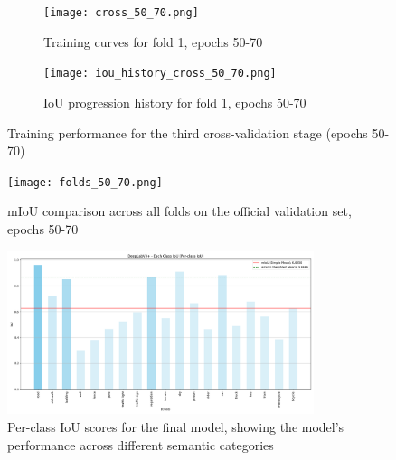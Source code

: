 \documentclass[]{article}
\begin{document}
\begin{figure}[htbp]
    \centering
    \begin{subfigure}[b]{0.8\textwidth}
        \centering
        \texttt{[image: cross\_50\_70.png]}
        \caption{Training curves for fold 1, epochs 50-70}
        \label{fig:cross_val_50_70}
    \end{subfigure}
    \vspace{0.5cm}
    \begin{subfigure}[b]{0.8\textwidth}
        \centering
        \texttt{[image: iou\_history\_cross\_50\_70.png]}
        \caption{IoU progression history for fold 1, epochs 50-70}
        \label{fig:cross_val_50_70_iou_his}
    \end{subfigure}
    \caption{Training performance for the third cross-validation stage (epochs 50-70)}
    \label{fig:cross_val_50_70_combined}
\end{figure}

\begin{figure}[htbp]
    \centering
    \texttt{[image: folds\_50\_70.png]}
    \caption{mIoU comparison across all folds on the official validation set, epochs 50-70}
    \label{fig:cross_val_50_70_val}
\end{figure}

\begin{figure}[htbp]
    \centering
    \includegraphics[width=0.8\textwidth]{outputs/deeplabv3plus_test_results/per_class_iou.png}
    \caption{Per-class IoU scores for the final model, showing the model's performance across different semantic categories}
    \label{fig:per_class_iou}
\end{figure}
\end{document}
